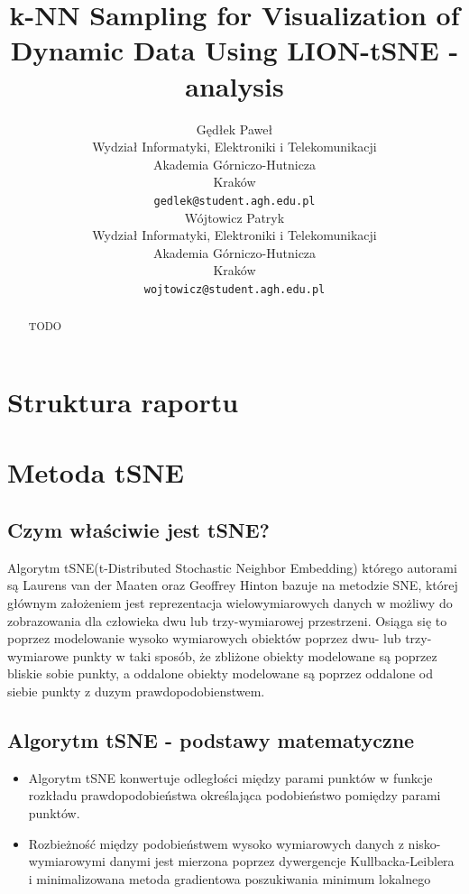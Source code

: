 \documentclass{article}
\title{k-NN Sampling for Visualization of Dynamic Data Using LION-tSNE - analysis}
\author{
 Gędłek Paweł \\
  Wydział Informatyki, Elektroniki i Telekomunikacji\\
  Akademia Górniczo-Hutnicza \\
  Kraków \\
  \texttt{gedlek@student.agh.edu.pl} \\
  \And
Wójtowicz Patryk \\
  Wydział Informatyki, Elektroniki i Telekomunikacji\\
  Akademia Górniczo-Hutnicza \\
  Kraków \\
  \texttt{wojtowicz@student.agh.edu.pl} \\
}
\begin{document}
\maketitle
\begin{abstract}
TODO
\end{abstract}




\section{Struktura raportu}
\label{sec:report_structure}
\paragraph{}
\tableofcontents

\section{Metoda tSNE}
\label{sec:tSNE}
\paragraph{}
\subsection{Czym właściwie jest tSNE?}
Algorytm tSNE(t-Distributed Stochastic Neighbor Embedding) którego
autorami są Laurens van der Maaten oraz Geoffrey Hinton bazuje na
metodzie SNE, której głównym założeniem jest reprezentacja
wielowymiarowych danych w możliwy do zobrazowania dla człowieka dwu lub
trzy-wymiarowej przestrzeni. Osiąga się to poprzez modelowanie wysoko
wymiarowych obiektów poprzez dwu- lub trzy-wymiarowe punkty w taki
sposób, że zbliżone obiekty modelowane są poprzez bliskie sobie punkty, a
oddalone obiekty modelowane są poprzez oddalone od siebie punkty z
duzym prawdopodobienstwem.

\subsection{Algorytm tSNE - podstawy matematyczne}
\begin{itemize}
\item 
Algorytm tSNE konwertuje odległości między parami punktów w
funkcje rozkładu prawdopodobieństwa określająca podobieństwo
pomiędzy parami punktów.
\item 
Rozbieżność między podobieństwem wysoko wymiarowych danych z
nisko-wymiarowymi danymi jest mierzona poprzez dywergencje
Kullbacka-Leiblera i minimalizowana metoda gradientowa
poszukiwania minimum lokalnego
\end{itemize}
\end{document}
